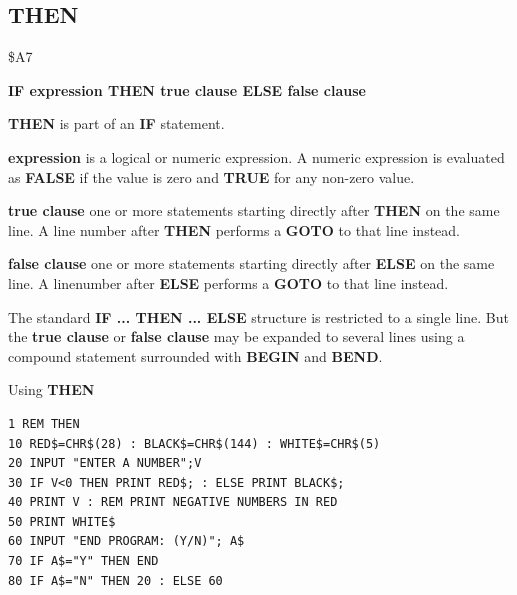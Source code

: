 
\newpage
\subsection{THEN}
\begin{description}[leftmargin=2cm,style=nextline]
\item [Token:] \$A7
\item [Format:] {\bf IF expression THEN true clause ELSE false clause}
\item [Usage:] {\bf THEN} is part of an {\bf IF} statement.

                {\bf expression} is a logical or numeric expression.
                A numeric expression is evaluated as {\bf FALSE}
                if the value is zero and {\bf TRUE} for any non-zero
                value.

                {\bf true clause} one or more statements starting
                directly after {\bf THEN} on the same line.
                A line number after {\bf THEN} performs a
                {\bf GOTO} to that line instead.

                {\bf false clause} one or more statements starting
                directly after {\bf ELSE} on the same line.
                A linenumber after {\bf ELSE} performs a
                {\bf GOTO} to that line instead.

\item [Remarks:]
               The standard {\bf IF ... THEN ... ELSE} structure
               is restricted to a single line. But the {\bf true clause}
               or {\bf false clause} may be expanded to several lines
               using a compound statement surrounded with
               {\bf BEGIN} and {\bf BEND}.
\item [Example:]
                Using {\bf THEN}
\begin{tcolorbox}[colback=black,coltext=white]
\verbatimfont{\codefont}
\begin{verbatim}
1 REM THEN
10 RED$=CHR$(28) : BLACK$=CHR$(144) : WHITE$=CHR$(5)
20 INPUT "ENTER A NUMBER";V
30 IF V<0 THEN PRINT RED$; : ELSE PRINT BLACK$;
40 PRINT V : REM PRINT NEGATIVE NUMBERS IN RED
50 PRINT WHITE$
60 INPUT "END PROGRAM: (Y/N)"; A$
70 IF A$="Y" THEN END
80 IF A$="N" THEN 20 : ELSE 60
\end{verbatim}
\end{tcolorbox}
\end{description}

